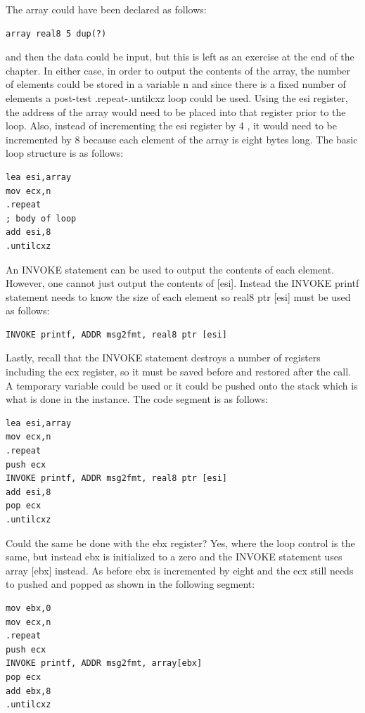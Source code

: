 \documentclass[10pt]{article}
\begin{document}
The array could have been declared as follows:

\begin{verbatim}
array real8 5 dup(?)
\end{verbatim}

and then the data could be input, but this is left as an exercise at the end of the chapter. In either case, in order to output the contents of the array, the number of elements could be stored in a variable n and since there is a fixed number of elements a post-test .repeat-.untilcxz loop could be used. Using the esi register, the address of the array would need to be placed into that register prior to the loop. Also, instead of incrementing the esi register by 4 , it would need to be incremented by 8 because each element of the array is eight bytes long. The basic loop structure is as follows:

\begin{verbatim}
lea esi,array
mov ecx,n
.repeat
; body of loop
add esi,8
.untilcxz
\end{verbatim}

An INVOKE statement can be used to output the contents of each element. However, one cannot just output the contents of [esi]. Instead the INVOKE printf statement needs to know the size of each element so real8 ptr [esi] must be used as follows:

\begin{verbatim}
INVOKE printf, ADDR msg2fmt, real8 ptr [esi]
\end{verbatim}

Lastly, recall that the INVOKE statement destroys a number of registers including the ecx register, so it must be saved before and restored after the call. A temporary variable could be used or it could be pushed onto the stack which is what is done in the instance. The code segment is as follows:

\begin{verbatim}
lea esi,array
mov ecx,n
.repeat
push ecx
INVOKE printf, ADDR msg2fmt, real8 ptr [esi]
add esi,8
pop ecx
.untilcxz
\end{verbatim}

Could the same be done with the ebx register? Yes, where the loop control is the same, but instead ebx is initialized to a zero and the INVOKE statement uses array [ebx] instead. As before ebx is incremented by eight and the ecx still needs to pushed and popped as shown in the following segment:

\begin{verbatim}
mov ebx,0
mov ecx,n
.repeat
push ecx
INVOKE printf, ADDR msg2fmt, array[ebx]
pop ecx
add ebx,8
.untilcxz
\end{verbatim}
\end{document}
